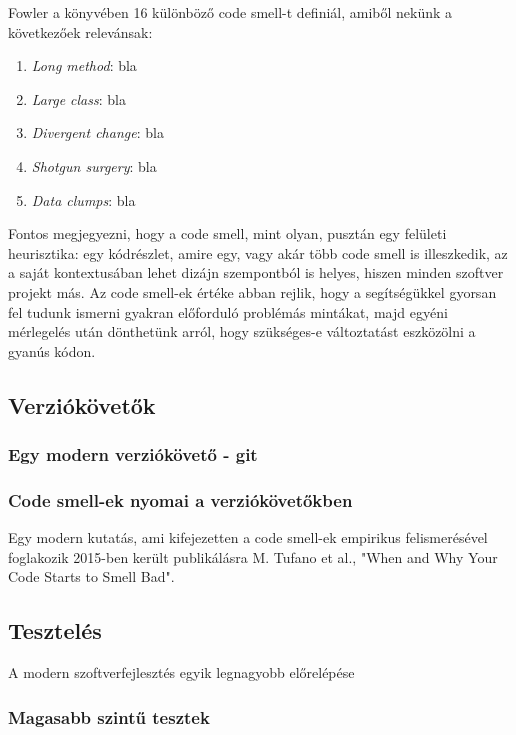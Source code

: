 Fowler a könyvében 16 különböző code smell-t definiál, amiből nekünk a következőek relevánsak:
\begin{enumerate}
    \item \textit{Long method}: bla
    \item \textit{Large class}: bla
    \item \textit{Divergent change}: bla
    \item \textit{Shotgun surgery}: bla
    \item \textit{Data clumps}: bla
\end{enumerate}

Fontos megjegyezni, hogy a code smell, mint olyan, pusztán egy felületi heurisztika: egy kódrészlet, amire egy, vagy akár több code smell is illeszkedik, az a saját kontextusában lehet dizájn szempontból is helyes, hiszen minden szoftver projekt más. Az code smell-ek értéke abban rejlik, hogy a segítségükkel gyorsan fel tudunk ismerni gyakran előforduló problémás mintákat, majd egyéni mérlegelés után dönthetünk arról, hogy szükséges-e változtatást eszközölni a gyanús kódon.

\subsection{Verziókövetők} 
\label{section:version_control}

\subsubsection{Egy modern verziókövető - git}

\subsubsection{Code smell-ek nyomai a verziókövetőkben}

Egy modern kutatás, ami kifejezetten a code smell-ek empirikus felismerésével foglakozik 2015-ben került publikálásra M. Tufano et al., "When and Why Your Code Starts to Smell Bad"\cite{codeSmells}.

\subsection{Tesztelés}

A modern szoftverfejlesztés egyik legnagyobb előrelépése 

\subsubsection{Magasabb szintű tesztek}

